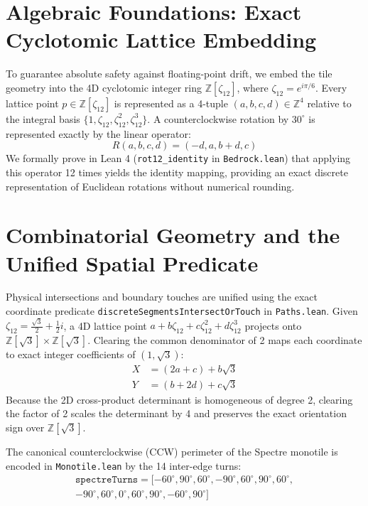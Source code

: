 \documentclass[11pt,a4paper]{article}
\begin{document}
\section{Algebraic Foundations: Exact Cyclotomic Lattice Embedding}
\label{sec:algebra}
To guarantee absolute safety against floating-point drift, we embed the tile geometry into the 4D cyclotomic integer ring $\mathbb{Z}[\zeta_{12}]$, where $\zeta_{12} = e^{i\pi/6}$. Every lattice point $p \in \mathbb{Z}[\zeta_{12}]$ is represented as a 4-tuple $(a, b, c, d) \in \mathbb{Z}^4$ relative to the integral basis $\{1, \zeta_{12}, \zeta_{12}^2, \zeta_{12}^3\}$. A counterclockwise rotation by $30^\circ$ is represented exactly by the linear operator:
\begin{equation}
R(a, b, c, d) = (-d, a, b + d, c)
\end{equation}
We formally prove in Lean 4 (\texttt{rot12\_identity} in \texttt{Bedrock.lean}) that applying this operator 12 times yields the identity mapping, providing an exact discrete representation of Euclidean rotations without numerical rounding.

\section{Combinatorial Geometry and the Unified Spatial Predicate}
\label{sec:sensors}
Physical intersections and boundary touches are unified using the exact coordinate predicate \texttt{discreteSegmentsIntersectOrTouch} in \texttt{Paths.lean}.
Given $\zeta_{12} = \frac{\sqrt{3}}{2} + \frac{1}{2}i$, a 4D lattice point $a + b\zeta_{12} + c\zeta_{12}^2 + d\zeta_{12}^3$ projects onto $\mathbb{Z}[\sqrt{3}] \times \mathbb{Z}[\sqrt{3}]$. Clearing the common denominator of 2 maps each coordinate to exact integer coefficients of $(1, \sqrt{3})$:
\begin{align}
X &= (2a + c) + b\sqrt{3} \\
Y &= (b + 2d) + c\sqrt{3}
\end{align}
Because the 2D cross-product determinant is homogeneous of degree 2, clearing the factor of 2 scales the determinant by 4 and preserves the exact orientation sign over $\mathbb{Z}[\sqrt{3}]$.

The canonical counterclockwise (CCW) perimeter of the Spectre monotile is encoded in \texttt{Monotile.lean} by the 14 inter-edge turns:
\begin{multline}
\texttt{spectreTurns} = [-60^\circ, 90^\circ, 60^\circ, -90^\circ, 60^\circ, 90^\circ, 60^\circ, \\
-90^\circ, 60^\circ, 0^\circ, 60^\circ, 90^\circ, -60^\circ, 90^\circ]
\end{multline}
\end{document}
